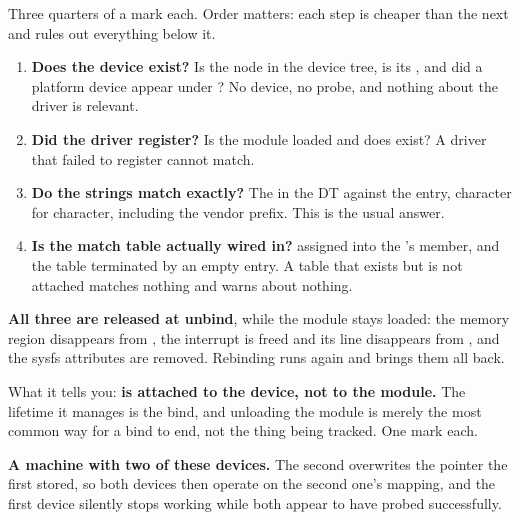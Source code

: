 
Three quarters of a mark each. Order matters: each step is cheaper than the next and rules out
everything below it.
\begin{enumerate}
  \item \textbf{Does the device exist?} Is the node in the device tree, is its 
    , and did a platform device appear under ? No
    device, no probe, and nothing about the driver is relevant.
  \item \textbf{Did the driver register?} Is the module loaded and does
     exist? A driver that failed to register cannot match.
  \item \textbf{Do the strings match exactly?} The  in the DT against the
     entry, character for character, including the vendor prefix. This is the
    usual answer.
  \item \textbf{Is the match table actually wired in?}  assigned into the
    's  member, and the table terminated by an empty
    entry. A table that exists but is not attached matches nothing and warns about nothing.
\end{enumerate}

\textbf{All three are released at unbind}, while the module stays loaded: the memory region
disappears from , the interrupt is freed and its line disappears from
, and the sysfs attributes are removed. Rebinding runs  again and
brings them all back.

What it tells you: \textbf{ is attached to the device, not to the module.} The lifetime
it manages is the bind, and unloading the module is merely the most common way for a bind to end,
not the thing being tracked. One mark each.

\textbf{A machine with two of these devices.} The second  overwrites the pointer the
first stored, so both devices then operate on the second one's mapping, and the first device
silently stops working while both appear to have probed successfully.


